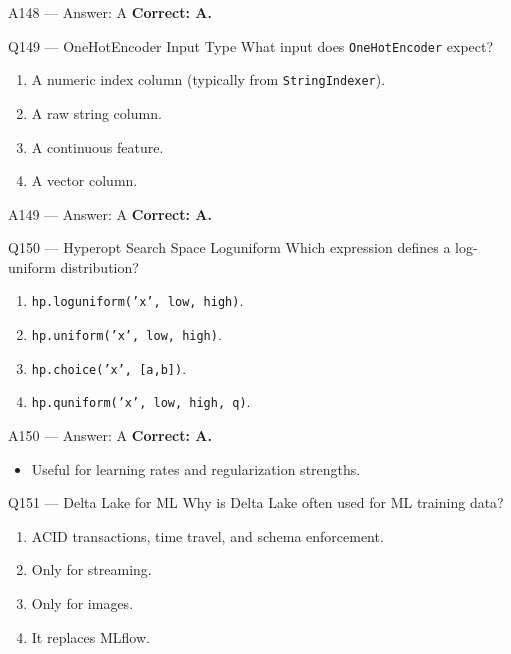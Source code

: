 \documentclass[aspectratio=169,9pt]{beamer}
\begin{document}
	\begin{frame}{A148 --- Answer: A}
		\textbf{Correct: A.}
	\end{frame}
	
	\begin{frame}{Q149 --- OneHotEncoder Input Type}
		What input does \texttt{OneHotEncoder} expect?
		\begin{enumerate}[label=\Alph*.]
			\item A numeric index column (typically from \texttt{StringIndexer}).
			\item A raw string column.
			\item A continuous feature.
			\item A vector column.
		\end{enumerate}
	\end{frame}
	
	\begin{frame}{A149 --- Answer: A}
		\textbf{Correct: A.}
	\end{frame}
	
	\begin{frame}{Q150 --- Hyperopt Search Space Loguniform}
		Which expression defines a log-uniform distribution?
		\begin{enumerate}[label=\Alph*.]
			\item \texttt{hp.loguniform('x', low, high)}.
			\item \texttt{hp.uniform('x', low, high)}.
			\item \texttt{hp.choice('x', [a,b])}.
			\item \texttt{hp.quniform('x', low, high, q)}.
		\end{enumerate}
	\end{frame}
	
	\begin{frame}{A150 --- Answer: A}
		\textbf{Correct: A.}
		\begin{itemize}
			\item Useful for learning rates and regularization strengths.
		\end{itemize}
	\end{frame}
	
	
	\begin{frame}{Q151 --- Delta Lake for ML}
		Why is Delta Lake often used for ML training data?
		\begin{enumerate}[label=\Alph*.]
			\item ACID transactions, time travel, and schema enforcement.
			\item Only for streaming.
			\item Only for images.
			\item It replaces MLflow.
		\end{enumerate}
	\end{frame}
	
\end{document}
